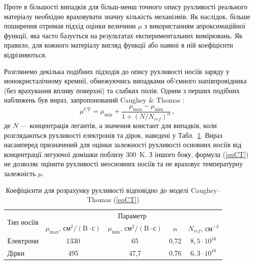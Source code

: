 \documentclass[14pt,a4paper,titlepage,oneside]{book}
\numberwithin{equation}{part}
\begin{document}
Проте в більшості випадків для більш-менш точного опису рухливості реального матеріалу необхідно враховувати значну кількість механізмів.
Як наслідок, більше поширення отримав підхід оцінки величини $\mu$ з використанням апроксимаційної функції, яка часто базується на результатах експериментальних вимірювань.
Як правило, для кожного матеріалу вигляд функції або наявні в ній коефіцієнти відрізняються.

Розглянемо декілька подібних підходів до опису рухливості носіїв заряду у монокристалічному кремнії, обмежуючись випадками об'ємного напівпровідника
(без врахування впливу поверхні) та слабких полів.
Одним з перших подібних наближень був вираз, запропонований   Caughey \& Thomas \cite{Caughey1967}:
\begin{equation}\label{eqCT}
  \mu^\mathrm{CT}=\mu_\mathrm{min}+\frac{\mu_\mathrm{max}-\mu_\mathrm{min}}{1+(N/N_{ref})^\alpha}\,,
\end{equation}
де
$N$ --- концентрація легантів,
а значення констант для випадків, коли розглядаються рухливості електронів та дірок, наведені у Табл.~\ref{tblCT}.
Вираз насамперед призначений для оцінки залежності рухливості основних носіїв від концентрації легуючої домішки поблизу 300~K.
З іншого боку, формула (\ref{eqCT}) не дозволяє оцінити рухливості неосновних носіїв та не враховує температурну залежність $\mu$.


\begin{table}
\caption{Коефіцієнти для розрахунку рухливості відповідно до моделі Caughey--Thomas (\ref{eqCT})}
\label{tblCT}
\centering
\begin{tabular}{|l|c|c|c|c|}
\hline
\multirow{2}{*}{Тип носіїв} & \multicolumn{4}{c|}{Параметр} \\
\cline{2-5}
&$\mu_\mathrm{max}$, $\text{см}^2/(\text{B}\cdot\text{с})$&$\mu_\mathrm{min}$, $\text{см}^2/(\text{B}\cdot\text{с})$&$\alpha$&$N_{ref}$, см$^{-3}$ \rule{0pt}{13pt}\\
\hline
Електрони&1330&65&0,72&$8,5\cdot10^{16}$\\
\hline
Дірки&495&47,7&0,76&$6,3\cdot10^{16}$\\
\hline
\end{tabular}
\end{table}
\end{document}
